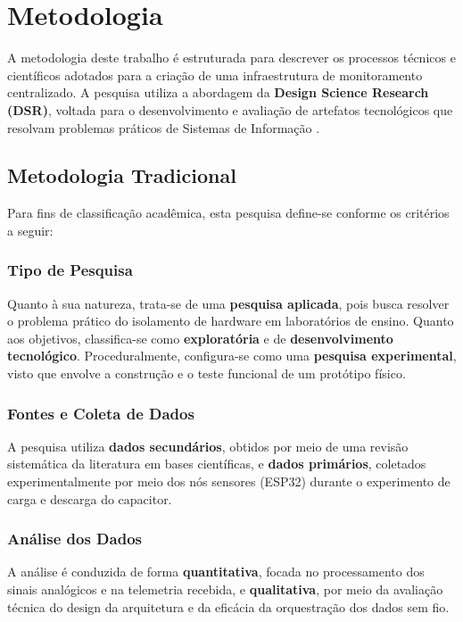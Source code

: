 \chapter{Metodologia}

A metodologia deste trabalho é estruturada para descrever os processos técnicos e científicos adotados para a criação de uma infraestrutura de monitoramento centralizado. A pesquisa utiliza a abordagem da \textbf{Design Science Research (DSR)}, voltada para o desenvolvimento e avaliação de artefatos tecnológicos que resolvam problemas práticos de Sistemas de Informação \cite{hevner}.

\section{Metodologia Tradicional}

Para fins de classificação acadêmica, esta pesquisa define-se conforme os critérios a seguir:

\subsection{Tipo de Pesquisa}  
Quanto à sua natureza, trata-se de uma \textbf{pesquisa aplicada}, pois busca resolver o problema prático do isolamento de hardware em laboratórios de ensino. Quanto aos objetivos, classifica-se como \textbf{exploratória} e de \textbf{desenvolvimento tecnológico}. Proceduralmente, configura-se como uma \textbf{pesquisa experimental}, visto que envolve a construção e o teste funcional de um protótipo físico.

\subsection{Fontes e Coleta de Dados}  
A pesquisa utiliza \textbf{dados secundários}, obtidos por meio de uma revisão sistemática da literatura em bases científicas, e \textbf{dados primários}, coletados experimentalmente por meio dos nós sensores (ESP32) durante o experimento de carga e descarga do capacitor.

\subsection{Análise dos Dados}  
A análise é conduzida de forma \textbf{quantitativa}, focada no processamento dos sinais analógicos e na telemetria recebida, e \textbf{qualitativa}, por meio da avaliação técnica do design da arquitetura e da eficácia da orquestração dos dados sem fio.


